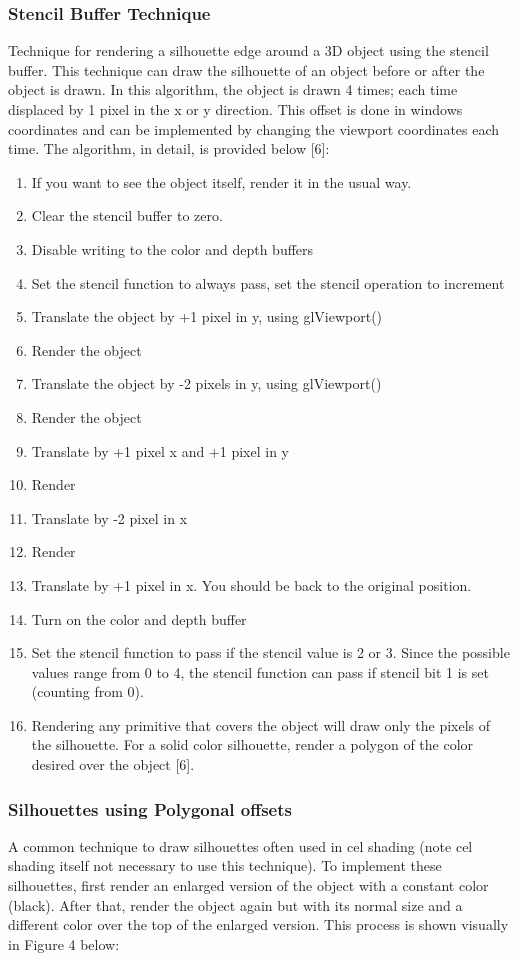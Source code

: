 \documentclass[10pt,journal,compsoc,draftclsnofoot]{IEEEtran}
\begin{document}
\subsubsection{Stencil Buffer Technique}
Technique for rendering a silhouette edge around a 3D object using the stencil buffer.
This technique can draw the silhouette of an object before or after the object is drawn.
In this algorithm, the object is drawn 4 times; each time displaced by 1 pixel in the x or y direction. \cite{silhouette}
This offset is done in windows coordinates and can be implemented by changing the viewport coordinates each time.
The algorithm, in detail, is provided below [6]:
\begin{enumerate}
\item If you want to see the object itself, render it in the usual way.
\item Clear the stencil buffer to zero.
\item Disable writing to the color and depth buffers
\item Set the stencil function to always pass, set the stencil operation to increment
\item Translate the object by +1 pixel in y, using glViewport()
\item Render the object
\item Translate the object by -2 pixels in y, using glViewport()
\item Render the object
\item Translate by +1 pixel x and +1 pixel in y
\item Render
\item Translate by -2 pixel in x
\item Render
\item Translate by +1 pixel in x. You should be back to the original position.
\item Turn on the color and depth buffer
\item Set the stencil function to pass if the stencil value is 2 or 3. Since the possible values range from 0 to 4, the stencil function can pass if stencil bit 1 is set (counting from 0).
\item Rendering any primitive that covers the object will draw only the pixels of the silhouette. For a solid color silhouette, render a polygon of the color desired over the object [6].
\end{enumerate}

\newpage

\subsubsection{Silhouettes using Polygonal offsets}
A common technique to draw silhouettes often used in cel shading (note cel shading itself not necessary to use this technique).
To implement these silhouettes, first render an enlarged version of the object with a constant color (black). \cite{nonphotorealisticsilhouette}
After that, render the object again but with its normal size and a different color over the top of the enlarged version.
This process is shown visually in Figure 4 below:
\end{document}
